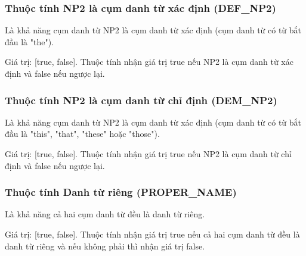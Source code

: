 \documentclass[12pt]{extarticle}
\begin{document}
			\subsubsection*{Thuộc tính NP2 là cụm danh từ xác định (DEF\_NP2)}
				\par Là khả năng cụm danh từ NP2 là cụm danh từ xác định (cụm danh từ có từ bắt đầu là "the"). 
				\par Giá trị: [true, false]. Thuộc tính nhận giá trị true nếu NP2 là cụm danh từ xác định và false nếu ngược lại.

			\subsubsection*{Thuộc tính NP2 là cụm danh từ chỉ định (DEM\_NP2)}
				\par Là khả năng cụm danh từ NP2 là cụm danh từ xác định (cụm danh từ có từ bắt đầu là "this", "that", "these" hoặc "those"). 
				\par Giá trị: [true, false]. Thuộc tính nhận giá trị true nếu NP2 là cụm danh từ chỉ định và false nếu ngược lại.

			\subsubsection*{Thuộc tính Danh từ riêng (PROPER\_NAME)}
				\par Là khả năng cả hai cụm danh từ đều là danh từ riêng.
				\par Giá trị: [true, false]. Thuộc tính nhận giá trị true nếu cả hai cụm danh từ đều là danh từ riêng và nếu không phải thì nhận giá trị false.
\end{document}
